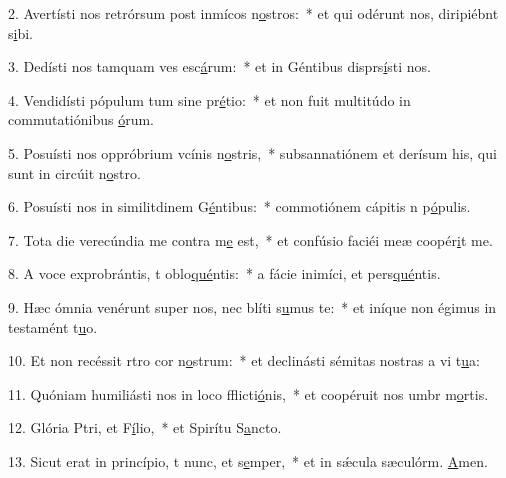 2. Avertísti nos retrórsum post inmícos n\uline{o}stros:~* et qui odérunt nos, diripiébnt s\uline{i}bi.\par 
3. Dedísti nos tamquam ves esc\uline{á}rum:~* et in Géntibus disprs\uline{í}sti nos.\par 
4. Vendidísti pópulum tum sine pr\uline{é}tio:~* et non fuit multitúdo in commutatiónibus \uline{ó}rum.\par 
5. Posuísti nos oppróbrium vcínis n\uline{o}stris,~* subsannatiónem et derísum his, qui sunt in circúit n\uline{o}stro.\par 
6. Posuísti nos in similitdinem G\uline{é}ntibus:~* commotiónem cápitis n p\uline{ó}pulis.\par 
7. Tota die verecúndia me contra m\uline{e} est,~* et confúsio faciéi meæ coopér\uline{i}t me.\par 
8. A voce exprobrántis, t oblo\uline{qué}ntis:~* a fácie inimíci, et pers\uline{qué}ntis.\par 
9. Hæc ómnia venérunt super nos, nec blíti s\uline{u}mus te:~* et iníque non égimus in testamént t\uline{u}o.\par 
10. Et non recéssit rtro cor n\uline{o}strum:~* et declinásti sémitas nostras a vi t\uline{u}a:\par 
11. Quóniam humiliásti nos in loco fflicti\uline{ó}nis,~* et coopéruit nos umbr m\uline{o}rtis.\par 
12. Glória Ptri, et F\uline{í}lio,~* et Spirítu S\uline{a}ncto.\par 
13. Sicut erat in princípio, t nunc, et s\uline{e}mper,~* et in sǽcula sæculórm. \uline{A}men.\par 
